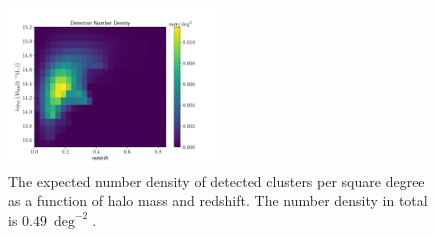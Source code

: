 \begin{figure}
 \centering
 \includegraphics[width=0.5\textwidth]{detNum_zm.pdf}
 \caption{The expected number density of detected clusters per square degree as
     a function of halo mass and redshift. The number density in total
     is $0.49~\deg^{-2}$.
     } \label{fig_detNum}
\end{figure}
